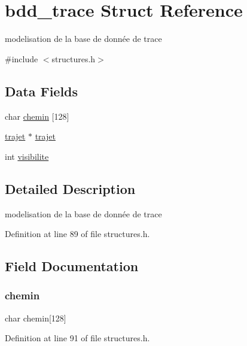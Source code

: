 \hypertarget{structbdd__trace}{}\section{bdd\+\_\+trace Struct Reference}
\label{structbdd__trace}


modelisation de la base de donnée de trace  




{\ttfamily \#include $<$structures.\+h$>$}

\subsection*{Data Fields}
\begin{DoxyCompactItemize}
\item 
char \hyperlink{structbdd__trace_afea51aac2a88c01d5ad5f97fc91ec472}{chemin} \mbox{[}128\mbox{]}
\item 
\hyperlink{structtrajet}{trajet} $\ast$ \hyperlink{structbdd__trace_ad417eb03de659793c712421b340fbec4}{trajet}
\item 
int \hyperlink{structbdd__trace_aa34b47a3ed3a7dfed8a672132bcc3f2a}{visibilite}
\end{DoxyCompactItemize}


\subsection{Detailed Description}
modelisation de la base de donnée de trace 

Definition at line 89 of file structures.\+h.



\subsection{Field Documentation}
\hypertarget{structbdd__trace_afea51aac2a88c01d5ad5f97fc91ec472}{}\label{structbdd__trace_afea51aac2a88c01d5ad5f97fc91ec472} 
\subsubsection{\texorpdfstring{chemin}{chemin}}
{\footnotesize\ttfamily char chemin\mbox{[}128\mbox{]}}



Definition at line 91 of file structures.\+h.


